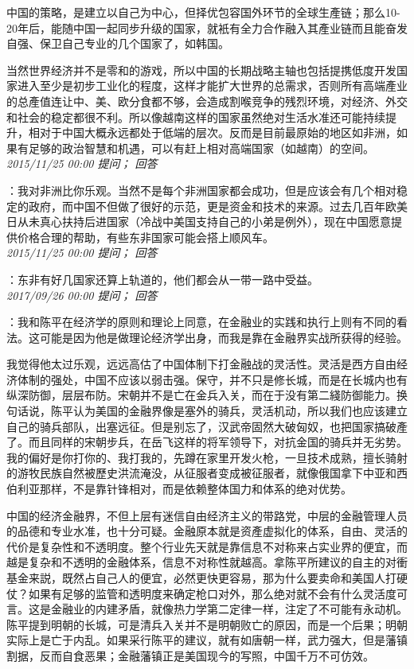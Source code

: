 \documentclass[twocolumn]{ctexart}
\begin{document}
中国的策略，是建立以自己为中心，但择优包容国外环节的全球生產链；那么10-20年后，能随中国一起同步升级的国家，就衹有全力合作融入其產业链而且能奋发自强、保卫自己专业的几个国家了，如韩国。

当然世界经济并不是零和的游戏，所以中国的长期战略主轴也包括提携低度开发国家进入至少是初步工业化的程度，这样才能扩大世界的总需求，否则所有高端產业的总產值连让中、美、欧分食都不够，会造成割喉竞争的残烈环境，对经济、外交和社会的稳定都很不利。所以像越南这样的国家虽然绝对生活水准还可能持续提升，相对于中国大概永远都处于低端的层次。反而是目前最原始的地区如非洲，如果有足够的政治智慧和机遇，可以有赶上相对高端国家（如越南）的空间。\\

\textit{\hfill\noindent\small 2015/11/25 00:00 提问； 回答}

：我对非洲比你乐观。当然不是每个非洲国家都会成功，但是应该会有几个相对稳定的政府，而中国不但做了很好的示范，更是资金和技术的来源。过去几百年欧美日从未真心扶持后进国家（冷战中美国支持自己的小弟是例外），现在中国愿意提供价格合理的帮助，有些东非国家可能会搭上顺风车。\\

\textit{\hfill\noindent\small 2015/11/25 00:00 提问； 回答}

：东非有好几国家还算上轨道的，他们都会从一带一路中受益。\\

\textit{\hfill\noindent\small 2017/09/26 00:00 提问； 回答}

：我和陈平在经济学的原则和理论上同意，在金融业的实践和执行上则有不同的看法。这可能是因为他是做理论经济学出身，而我是靠在金融界实战所获得的经验。

我觉得他太过乐观，远远高估了中国体制下打金融战的灵活性。灵活是西方自由经济体制的强处，中国不应该以弱击强。保守，并不只是修长城，而是在长城内也有纵深防御，层层布防。宋朝并不是亡在金兵入关，而在于没有第二綫防御能力。换句话说，陈平认为美国的金融界像是塞外的骑兵，灵活机动，所以我们也应该建立自己的骑兵部队，出塞远征。但是别忘了，汉武帝固然大破匈奴，也把国家搞破產了。而且同样的宋朝步兵，在岳飞这样的将军领导下，对抗金国的骑兵并无劣势。我的偏好是你打你的、我打我的，先蹲在家里开发火枪，一旦技术成熟，擅长骑射的游牧民族自然被歷史洪流淹没，从征服者变成被征服者，就像俄国拿下中亚和西伯利亚那样，不是靠针锋相对，而是依赖整体国力和体系的绝对优势。

中国的经济金融界，不但上层有迷信自由经济主义的带路党，中层的金融管理人员的品德和专业水准，也十分可疑。金融原本就是资產虚拟化的体系，自由、灵活的代价是复杂性和不透明度。整个行业先天就是靠信息不对称来占实业界的便宜，而越是复杂和不透明的金融体系，信息不对称性就越高。拿陈平所建议的自主的对衝基金来説，既然占自己人的便宜，必然更快更容易，那为什么要卖命和美国人打硬仗？如果有足够的监管和透明度来确定枪口对外，那么绝对就不会有什么灵活度可言。这是金融业的内建矛盾，就像热力学第二定律一样，注定了不可能有永动机。陈平提到明朝的长城，可是清兵入关并不是明朝败亡的原因，而是一个后果；明朝实际上是亡于内乱。如果采行陈平的建议，就有如唐朝一样，武力强大，但是藩镇割据，反而自食恶果；金融藩镇正是美国现今的写照，中国千万不可仿效。
\end{document}
